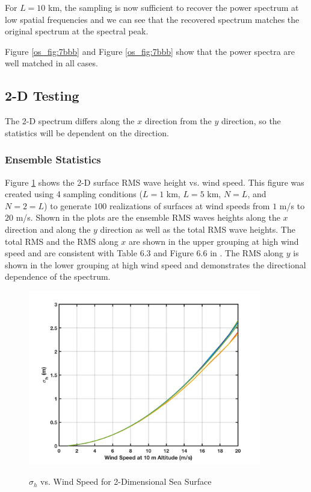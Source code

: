 For $L = 10$ km, the sampling is now sufficient to recover the power spectrum at low spatial frequencies and we can see that the recovered spectrum matches the original spectrum at the spectral peak.

Figure \ref{os_fig:7bbb} and Figure \ref{os_fig:7bbb} show that the power spectra are well matched in all cases.

\subsection {2-D Testing}
The 2-D spectrum differs along the $x$ direction from the $y$ direction, so the statistics will be dependent on the direction.

\subsubsection {Ensemble Statistics}
Figure \ref{os_fig:7ffg} shows the 2-D surface RMS wave height vs. wind speed. This figure was created using 4 sampling conditions ($L = 1 $ km, $L = 5 $ km, $N = L$, and $N = 2=L$) to generate $100$ realizations of surfaces at wind speeds from $1$ m/s to $20$ m/s. Shown in the plots are the ensemble RMS waves heights along the $x$ direction and along the $y$ direction as well as the total RMS wave heights. The total RMS and the RMS along $x$ are shown in the upper grouping at high wind speed and are consistent with Table 6.3 and Figure 6.6 in \cite{temper_guide}. The RMS along $y$ is shown in the lower grouping at high wind speed and demonstrates the directional dependence of the spectrum.

\begin{figure}[H]
  \begin{center}
\includegraphics[width=4in]{../media/Ocean_Surface/2d_ensemble_rms.png}
  \end{center}
  \renewcommand{\baselinestretch}{1} \small\normalsize
  \begin{quote}
    \caption[$\sigma_h$ vs. Wind Speed for 2-Dimensional Sea Surface]{$\sigma_h$ vs. Wind Speed for 2-Dimensional Sea Surface\label{os_fig:7ffg}}
  \end{quote}
\end{figure}
\renewcommand{\baselinestretch}{2} \small\normalsize

